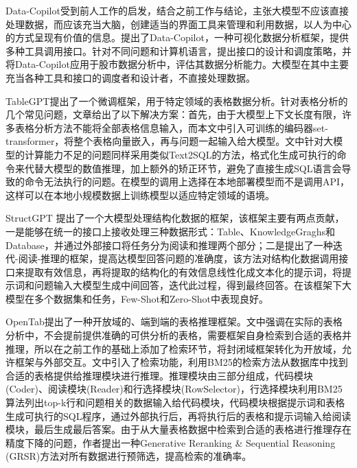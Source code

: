 Data-Copilot\cite{zhang2024data}受到前人工作的启发，结合之前工作与结论，主张大模型不应该直接处理数据，而应该充当大脑，创建适当的界面工具来管理和利用数据，以人为中心的方式呈现有价值的信息。提出了Data-Copilot，一种可视化数据分析框架，提供多种工具调用接口。针对不同问题和计算机语言，提出接口的设计和调度策略，并将Data-Copilot应用于股市数据分析中，评估其数据分析能力。大模型在其中主要充当各种工具和接口的调度者和设计者，不直接处理数据。

TableGPT\cite{zha2023tablegpt}提出了一个微调框架，用于特定领域的表格数据分析。针对表格分析的几个常见问题，文章给出了以下解决方案：首先，由于大模型上下文长度有限，许多表格分析方法不能将全部表格信息输入，而本文中引入可训练的编码器set-transformer，将整个表格向量嵌入，再与问题一起输入给大模型。文中针对大模型的计算能力不足的问题同样采用类似Text2SQL的方法，格式化生成可执行的命令来代替大模型的数值推理，加上额外的矫正环节，避免了直接生成SQL语言会导致的命令无法执行的问题。在模型的调用上选择在本地部署模型而不是调用API，这样可以在本地小规模数据上训练模型以适应特定领域的语境。

StructGPT \cite{jiang2023structgpt}提出了一个大模型处理结构化数据的框架，该框架主要有两点贡献，一是能够在统一的接口上接收处理三种数据形式：Table、KnowledgeGraghs和Database，并通过外部接口将任务分为阅读和推理两个部分；二是提出了一种迭代-阅读-推理的框架，提高达模型回答问题的准确度，该方法对结构化数据调用接口来提取有效信息，再将提取的结构化的有效信息线性化成文本化的提示词，将提示词和问题输入大模型生成中间回答，迭代此过程，得到最终回答。在该框架下大模型在多个数据集和任务，Few-Shot和Zero-Shot中表现良好。

OpenTab\cite{kongopentab}提出了一种开放域的、端到端的表格推理框架。文中强调在实际的表格分析中，不会提前提供准确的可供分析的表格，需要框架自身检索到合适的表格并推理，所以在之前工作\cite{chen2023label}的基础上添加了检索环节，将封闭域框架转化为开放域，允许框架与外部交互。文中引入了检索功能，利用BM25的检索方法从数据库中找到合适的表格提供给推理模块进行推理。推理模块由三部分组成，代码模块(Coder)、阅读模块(Reader)和行选择模块(RowSelector)，行选择模块利用BM25算法列出top-k行和问题相关的数据输入给代码模块，代码模块根据提示词和表格生成可执行的SQL程序，通过外部执行后，再将执行后的表格和提示词输入给阅读模块，最后生成最后答案。由于从大量表格数据中检索到合适的表格进行推理存在精度下降的问题，作者提出一种Generative Reranking \& Sequential Reasoning (GRSR)方法对所有数据进行预筛选，提高检索的准确率。

